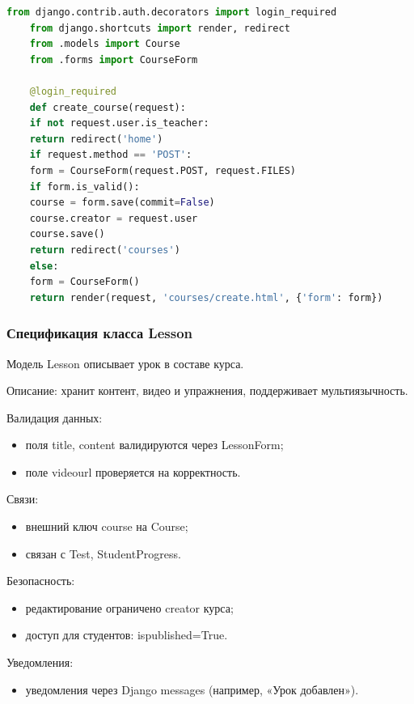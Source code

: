 \begin{lstlisting}[language=Python, caption=Представление для создания курса, label=lst:course_view]
	from django.contrib.auth.decorators import login_required
	from django.shortcuts import render, redirect
	from .models import Course
	from .forms import CourseForm
	
	@login_required
	def create_course(request):
	if not request.user.is_teacher:
	return redirect('home')
	if request.method == 'POST':
	form = CourseForm(request.POST, request.FILES)
	if form.is_valid():
	course = form.save(commit=False)
	course.creator = request.user
	course.save()
	return redirect('courses')
	else:
	form = CourseForm()
	return render(request, 'courses/create.html', {'form': form})
\end{lstlisting}

\subsubsection{Спецификация класса Lesson}

Модель Lesson описывает урок в составе курса.

Описание: хранит контент, видео и упражнения, поддерживает мультиязычность.

Валидация данных:
	\begin{itemize}
		\item поля title, content валидируются через LessonForm;
		\item поле videourl проверяется на корректность.
	\end{itemize}
	
Связи:
	\begin{itemize}
		\item внешний ключ course на Course;
		\item связан с Test, StudentProgress.
	\end{itemize}
	
Безопасность:
	\begin{itemize}
		\item редактирование ограничено creator курса;
		\item доступ для студентов: ispublished=True.
	\end{itemize}
	
Уведомления:
	\begin{itemize}
		\item уведомления через Django messages (например, «Урок добавлен»).
	\end{itemize}
	

